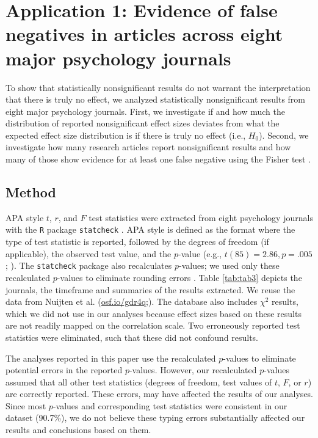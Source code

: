 \documentclass{article}
\begin{document}
\section*{Application 1: Evidence of false negatives in articles across eight major psychology journals}

To show that statistically nonsignificant results do not warrant the interpretation that there is truly no effect, we analyzed statistically nonsignificant results from eight major psychology journals. First, we investigate if and how much the distribution of reported nonsignificant effect sizes deviates from what the expected effect size distribution is if there is truly no effect (i.e., $H_0$). Second, we investigate how many research articles report nonsignificant results and how many of those show evidence for at least one false negative using the Fisher test \cite{Fisher1925-jl}.

\subsection*{Method}




APA style $t$, $r$, and $F$ test statistics were extracted from eight psychology journals with the \texttt{R} package \texttt{statcheck} \cite{Nuijten2015-od,Epskamp2015-ps}. APA style is defined as the format where the type of test statistic is reported, followed by the degrees of freedom (if applicable), the observed test value, and the $p$-value (e.g., $t(85)=2.86, p=.005$; \cite{American_Psychological_Association2010-qe}). The \texttt{statcheck} package also recalculates $p$-values; we used only these recalculated $p$-values to eliminate rounding errors \cite{Bakker2011-hg,Nuijten2015-od}. Table \ref{tab:tab3} depicts the journals, the timeframe and summaries of the results extracted. We reuse the data from Nuijten et al. (\url{osf.io/gdr4q};\cite{Nuijten2015-od}). The database also includes $\chi^2$ results, which we did not use in our analyses because effect sizes based on these results are not readily mapped on the correlation scale. Two erroneously reported test statistics were eliminated, such that these did not confound results. 

The analyses reported in this paper use the recalculated $p$-values to eliminate potential errors in the reported $p$-values. However, our recalculated $p$-values assumed that all other test statistics (degrees of freedom, test values of $t$, $F$, or $r$) are correctly reported. These errors,  may have affected the results of our analyses. Since most $p$-values and corresponding test statistics were consistent in our dataset (90.7\%), we do not believe these typing errors substantially affected our results and conclusions based on them.
\end{document}
